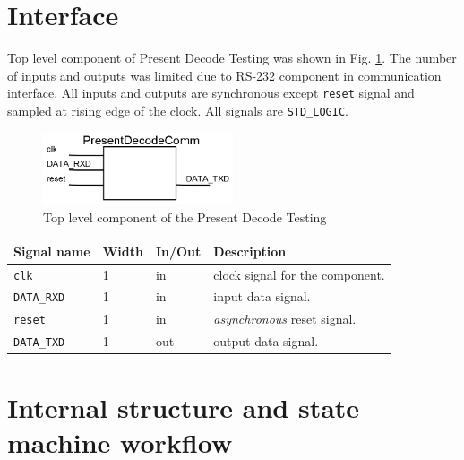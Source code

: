 \documentclass{gajewski}
\begin{document}
\newpage 

\section{Interface}

Top level component of Present Decode Testing was shown in Fig. \ref{pdectest}. The number of inputs and outputs was limited due to RS-232 component in communication interface. All inputs and outputs are synchronous except \texttt{reset} signal and sampled at rising edge of the clock. All signals are \texttt{STD\_LOGIC}.
\begin{figure}[!ht]%
    \begin{center}
    \includegraphics[width=0.5\textwidth]{img/PresentDecodeTesting.png}
    \caption{%
        Top level component of the Present Decode Testing 
     }%
    \label{pdectest}
    \end{center}
 \end{figure}

\begin{tabularx}{\textwidth}{|p{30mm}|p{11mm}|p{11mm}|X|}
  \hline \bf{Signal name} & \bf{Width} & \bf{In/Out} & \bf{Description}\\ 
  \hline \texttt{clk} & 1  &  in  & clock signal for the component. \\ 
  \hline \texttt{DATA\_RXD} & 1 & in & input data signal. \\
  \hline \texttt{reset}	& 1  &  in  &  \emph{asynchronous} reset signal.\\ 
  \hline \texttt{DATA\_TXD} & 1 &  out  & output data signal.	\\ 
  \hline
\end{tabularx}

\newpage

\section{Internal structure and state machine workflow}
\end{document}

